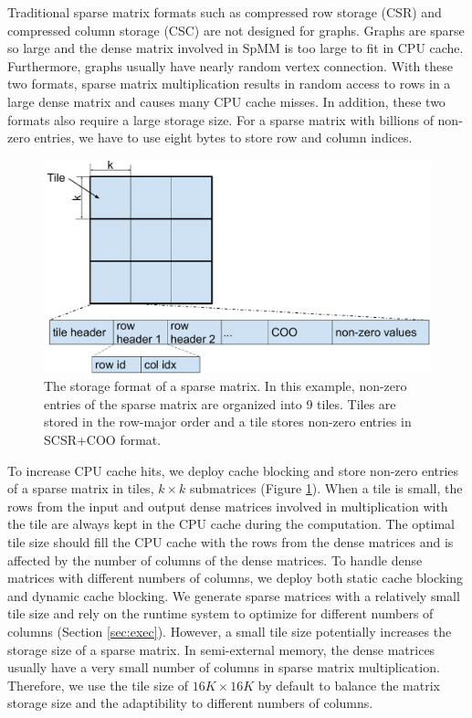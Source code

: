 Traditional sparse matrix formats such as compressed row storage (CSR) and
compressed column storage (CSC) are not designed for graphs. Graphs are sparse
so large and the dense matrix involved in SpMM is too large to fit in CPU cache.
Furthermore, graphs usually have nearly random vertex connection. With these
two formats, sparse matrix multiplication results in random access to rows in
a large dense matrix and causes
many CPU cache misses. In addition, these two formats also require a large
storage size. For a sparse matrix with billions of non-zero entries, we have to
use eight bytes to store row and column indices.

\begin{figure}
\centering
\includegraphics[scale=0.3]{SpMM_figs/sparse_mat.pdf}
\caption{The storage format of a sparse matrix. In this example, non-zero
entries of the sparse matrix are organized into 9 tiles. Tiles are stored in
the row-major order and a tile stores non-zero entries in SCSR+COO format.}
\label{sparse_mat}
\end{figure}

To increase CPU cache hits, we deploy cache blocking \cite{Im04} and store
non-zero entries of a sparse matrix in tiles, $k \times k$ submatrices (Figure
\ref{sparse_mat}).
When a tile is small, the rows from the input and output dense matrices
involved in multiplication with the tile are always kept in the CPU cache
during the computation. The optimal tile size should fill the CPU cache
with the rows from the dense matrices and is affected by the number of columns
of the dense matrices. To handle dense matrices with different numbers
of columns, we deploy both static cache blocking and dynamic cache blocking.
We generate sparse matrices with a relatively small tile size and
rely on the runtime system
to optimize for different numbers of columns (Section \ref{sec:exec}).
However, a small tile size potentially increases the storage size of a sparse
matrix. In semi-external memory, the dense matrices usually have
a very small number of columns in sparse matrix multiplication. Therefore, we
use the tile size of $16K \times 16K$ by default to balance the matrix storage
size and the adaptibility to different numbers of columns.

